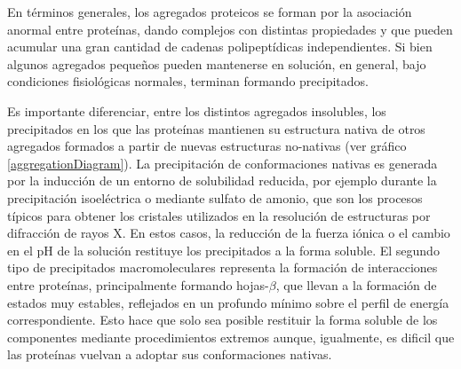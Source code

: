 En términos generales, los agregados proteicos se forman por la asociación anormal entre proteínas, dando complejos con distintas propiedades y que pueden acumular una gran cantidad de cadenas polipeptídicas independientes.
Si bien algunos agregados pequeños pueden mantenerse en solución, en general, bajo condiciones fisiológicas normales, terminan formando precipitados.

Es importante diferenciar, entre los distintos agregados insolubles, los precipitados en los que las proteínas mantienen su estructura nativa de otros agregados formados a partir de nuevas estructuras no-nativas (ver gráfico \ref{aggregationDiagram}).
La precipitación de conformaciones nativas es generada por la inducción de un entorno de solubilidad reducida, por ejemplo durante la precipitación isoeléctrica o mediante sulfato de amonio,
que son los procesos típicos para obtener los cristales utilizados en la resolución de estructuras por difracción de rayos X. 
En estos casos, la reducción de la fuerza iónica o el cambio en el pH de la solución restituye los precipitados a la forma soluble.
El segundo tipo de precipitados macromoleculares representa la formación de interacciones entre proteínas, principalmente formando hojas-$\beta$, que llevan a la formación de estados muy estables, 
reflejados en un profundo mínimo sobre el perfil de energía correspondiente. 
Esto hace que solo sea posible restituir la forma soluble de los componentes mediante procedimientos extremos aunque, igualmente, es dificil que las proteínas vuelvan a adoptar sus conformaciones nativas.

